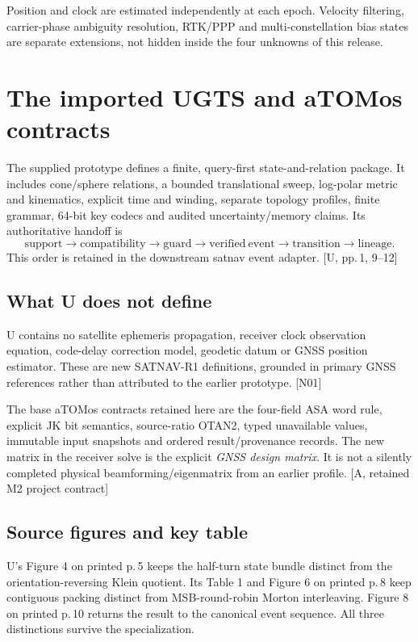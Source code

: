 \documentclass[11pt,a4paper]{article}
\newcommand{\src}[1]{\textcolor{muted}{[U, #1]}}
\newcommand{\base}{\textcolor{muted}{[A, retained M2 project contract]}}
\newcommand{\dec}[1]{\textcolor{accent}{[N#1]}}
\begin{document}
Position and clock are estimated independently at each epoch. Velocity filtering,
carrier-phase ambiguity resolution, RTK/PPP and multi-constellation bias states are
separate extensions, not hidden inside the four unknowns of this release.
\clearpage
\tableofcontents
\clearpage

\section{The imported UGTS and aTOMos contracts}
The supplied prototype defines a finite, query-first state-and-relation package. It
includes cone/sphere relations, a bounded translational sweep, log-polar metric and
kinematics, explicit time and winding, separate topology profiles, finite grammar,
64-bit key codecs and audited uncertainty/memory claims. Its authoritative handoff is
\begin{equation}
\mathrm{support}\to\mathrm{compatibility}\to\mathrm{guard}\to\mathrm{verified\ event}
\to\mathrm{transition}\to\mathrm{lineage}.
\end{equation}
This order is retained in the downstream satnav event adapter. \src{pp.\,1, 9--12}

\subsection{What U does not define}
U contains no satellite ephemeris propagation, receiver clock observation equation,
code-delay correction model, geodetic datum or GNSS position estimator. These are
new SATNAV-R1 definitions, grounded in primary GNSS references rather than attributed
to the earlier prototype. \dec{01}

The base aTOMos contracts retained here are the four-field ASA word rule, explicit JK
bit semantics, source-ratio OTAN2, typed unavailable values, immutable input snapshots
and ordered result/provenance records. The new matrix in the receiver solve is the
explicit \emph{GNSS design matrix}. It is not a silently completed physical
beamforming/eigenmatrix from an earlier profile. \base

\subsection{Source figures and key table}
U's Figure 4 on printed p.\,5 keeps the half-turn state bundle distinct from the
orientation-reversing Klein quotient. Its Table 1 and Figure 6 on printed p.\,8 keep
contiguous packing distinct from MSB-round-robin Morton interleaving. Figure 8 on
printed p.\,10 returns the result to the canonical event sequence. All three distinctions
survive the specialization.
\end{document}
